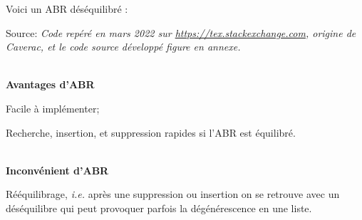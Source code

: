 \documentclass[hidelinks,a4paper,12pt]{article}
\begin{document}
Voici un ABR déséquilibré : 
\begin{center}
	\caption*{Source: \textit{Code repéré en mars 2022 sur \href{https://tex.stackexchange.com/questions/422128/how-to-make-binary-search-trees-in-an-easy-and-straight-forward-way}{https://tex.stackexchange.com}, origine de Caverac, et le code source développé figure en annexe.} } 
\end{center}

~\\

\textbf {Avantages d'ABR} \medskip \\
\begin{description}[font=$\bullet$~\normalfont\scshape\color{red!50!black}]
	\item Facile à implémenter;
	\item Recherche, insertion, et suppression rapides si l'ABR est équilibré.
\end{description}

~\\

\textbf {Inconvénient d'ABR} \medskip \\
\begin{description}[font=$\bullet$~\normalfont\scshape\color{red!50!black}]
	\item Rééquilibrage, \textit{i.e.} après une suppression ou insertion on se retrouve avec un déséquilibre qui peut provoquer parfois la dégénérescence en une liste.
\end{description}

~\\
 
\end{document}
